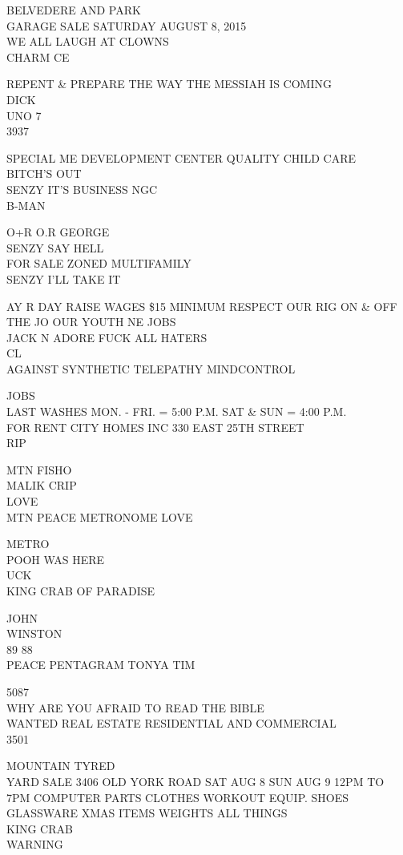 \documentclass[10pt,letterpaper]{article}
\begin{document}
BELVEDERE AND PARK\\
GARAGE SALE SATURDAY AUGUST 8, 2015\\
WE ALL LAUGH AT CLOWNS\\
CHARM CE

REPENT \& PREPARE THE WAY THE MESSIAH IS COMING\\
DICK\\
UNO 7\\
3937

SPECIAL ME DEVELOPMENT CENTER QUALITY CHILD CARE\\
BITCH'S OUT\\
SENZY IT'S BUSINESS NGC\\
B{-}MAN

O+R O.R GEORGE\\
SENZY SAY HELL\\
FOR SALE ZONED MULTIFAMILY\\
SENZY I'LL TAKE IT

AY R DAY RAISE WAGES \$15 MINIMUM RESPECT OUR RIG ON \& OFF THE JO OUR YOUTH NE JOBS\\
JACK N ADORE FUCK ALL HATERS\\
CL\\
AGAINST SYNTHETIC TELEPATHY MINDCONTROL

JOBS\\
LAST WASHES MON. {-} FRI. = 5:00 P.M. SAT \& SUN = 4:00 P.M.\\
FOR RENT CITY HOMES INC 330 EAST 25TH STREET\\
RIP

MTN FISHO\\
MALIK CRIP\\
LOVE\\
MTN PEACE METRONOME LOVE

METRO\\
POOH WAS HERE\\
UCK\\
KING CRAB OF PARADISE

JOHN\\
WINSTON\\
89 88\\
PEACE PENTAGRAM TONYA TIM

5087\\
WHY ARE YOU AFRAID TO READ THE BIBLE\\
WANTED REAL ESTATE RESIDENTIAL AND COMMERCIAL\\
3501

MOUNTAIN TYRED\\
YARD SALE 3406 OLD YORK ROAD SAT AUG 8 SUN AUG 9 12PM TO 7PM COMPUTER PARTS CLOTHES WORKOUT EQUIP. SHOES GLASSWARE XMAS ITEMS WEIGHTS ALL THINGS\\
KING CRAB\\
WARNING
\end{document}
